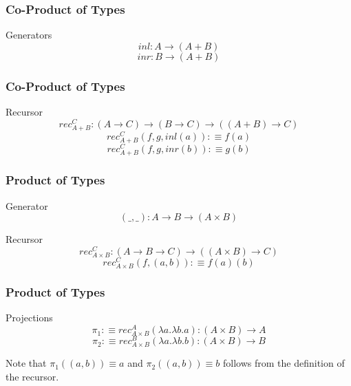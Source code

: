 \documentclass[14pt,compress]{beamer}
\begin{document}
\begin{frame}\label{frame : gen of co-product}
\frametitle{Co-Product of Types}

\begin{block}{Generators}
\textcolor{beamer@mathtext}{
\[ inl : A \to (A + B) \]
\[ inr : B \to (A + B) \]}
\end{block}
\end{frame}

\begin{frame}\label{frame : rec of co-product}
\frametitle{Co-Product of Types}

\begin{block}{Recursor}
\textcolor{beamer@mathtext}{
\[ rec_{A+B}^C : (A \to C) \to (B \to C) \to ((A + B) \to C) \]
\[ rec_{A+B}^C(f,g,inl(a)) :\equiv f(a) \]
\[ rec_{A+B}^C(f,g,inr(b)) :\equiv g(b) \]}
\end{block}
\end{frame}

\begin{frame}\label{frame : product type}
\frametitle{Product of Types}

\begin{block}{Generator}
\textcolor{beamer@mathtext}{
\[ (\_,\_) : A \to B \to (A \times B) \]}
\end{block}
\pause
\begin{block}{Recursor}
\textcolor{beamer@mathtext}{
\[ rec_{A \times B}^C : (A \to B \to C) \to ((A \times B) \to C) \]
\[ rec_{A \times B}^C(f,(a,b)) :\equiv f(a)(b) \]}
\end{block}
\end{frame}

\begin{frame}\label{frame : projections}
\frametitle{Product of Types}

\begin{block}{Projections}
\textcolor{beamer@mathtext}{
\[ \pi_1 :\equiv rec_{A \times B}^A (\lambda a. \lambda b. a) : (A \times B) \to A\]
\[ \pi_2 :\equiv rec_{A \times B}^B (\lambda a. \lambda b. b) : (A \times B) \to B\]}
\end{block}

\pause
\begin{block}{}
Note that $\pi_1((a,b)) \equiv a$ and $\pi_2((a,b)) \equiv b$
follows from the definition of the recursor.
\end{block}

\end{frame}
\end{document}
